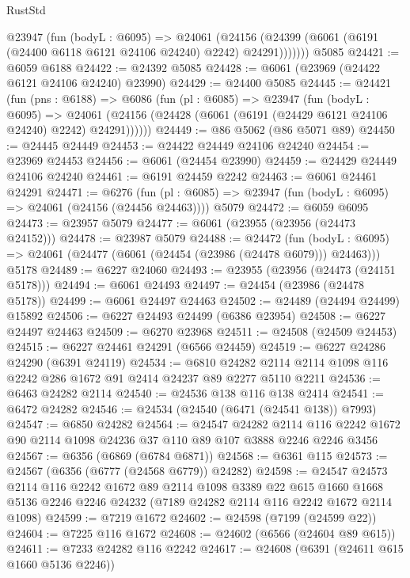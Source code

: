 \begin{lexlean}{RustStd}
\begin{coremodule}
{\begin{coremodule}
{{{{{{{{{{{{{{{{{{{{{{{{{{        @23947
          (fun (bodyL : @6095) =>
          @24061
            (@24156 (@24399 (@6061 (@6191 (@24400 @6118 @6121 @24106 @24240) @2242) @24291)))))))
    @5085
@24421 := @6059 @6188
@24422 := @24392 @5085
@24428 := @6061 (@23969 (@24422 @6121 @24106 @24240) @23990)
@24429 := @24400 @5085
@24445 := @24421
    (fun (pns : @6188) =>
    @6086
      (fun (pl : @6085) =>
      @23947
        (fun (bodyL : @6095) =>
        @24061 (@24156 (@24428 (@6061 (@6191 (@24429 @6121 @24106 @24240) @2242) @24291))))))
@24449 := @86 @5062 (@86 @5071 @89)
@24450 := @24445 @24449
@24453 := @24422 @24449 @24106 @24240
@24454 := @23969 @24453
@24456 := @6061 (@24454 @23990)
@24459 := @24429 @24449 @24106 @24240
@24461 := @6191 @24459 @2242
@24463 := @6061 @24461 @24291
@24471 := @6276
    (fun (pl : @6085) => @23947 (fun (bodyL : @6095) => @24061 (@24156 (@24456 @24463))))
    @5079
@24472 := @6059 @6095
@24473 := @23957 @5079
@24477 := @6061 (@23955 (@23956 (@24473 @24152)))
@24478 := @23987 @5079
@24488 := @24472
    (fun (bodyL : @6095) => @24061 (@24477 (@6061 (@24454 (@23986 (@24478 @6079))) @24463)))
    @5178
@24489 := @6227 @24060
@24493 := @23955 (@23956 (@24473 (@24151 @5178)))
@24494 := @6061 @24493
@24497 := @24454 (@23986 (@24478 @5178))
@24499 := @6061 @24497 @24463
@24502 := @24489 (@24494 @24499) @15892
@24506 := @6227 @24493 @24499 (@6386 @23954)
@24508 := @6227 @24497 @24463
@24509 := @6270 @23968
@24511 := @24508 (@24509 @24453)
@24515 := @6227 @24461 @24291 (@6566 @24459)
@24519 := @6227 @24286 @24290 (@6391 @24119)
@24534 := @6810
    @24282
    @2114
    @2114
    @1098
    @116
    @2242
    @286
    @1672
    @91
    @2414
    @24237
    @89
    @2277
    @5110
    @2211
@24536 := @6463 @24282 @2114
@24540 := @24536 @138 @116 @138 @2414
@24541 := @6472 @24282
@24546 := @24534 (@24540 (@6471 (@24541 @138)) @7993)
@24547 := @6850 @24282
@24564 := @24547
    @24282
    @2114
    @116
    @2242
    @1672
    @90
    @2114
    @1098
    @24236
    @37
    @110
    @89
    @107
    @3888
    @2246
    @2246
    @3456
@24567 := @6356 (@6869 (@6784 @6871))
@24568 := @6361 @115
@24573 := @24567 (@6356 (@6777 (@24568 @6779)) @24282)
@24598 := @24547
    @24573
    @2114
    @116
    @2242
    @1672
    @89
    @2114
    @1098
    @3389
    @22
    @615
    @1660
    @1668
    @5136
    @2246
    @2246
    @24232
    (@7189 @24282 @2114 @116 @2242 @1672 @2114 @1098)
@24599 := @7219 @1672
@24602 := @24598 (@7199 (@24599 @22))
@24604 := @7225 @116 @1672
@24608 := @24602 (@6566 (@24604 @89 @615))
@24611 := @7233 @24282 @116 @2242
@24617 := @24608 (@6391 (@24611 @615 @1660 @5136 @2246))
}}}}}}}}}}}}}}}}}}}}}}}}}}
\end{coremodule}}
\end{coremodule}
\end{lexlean}
